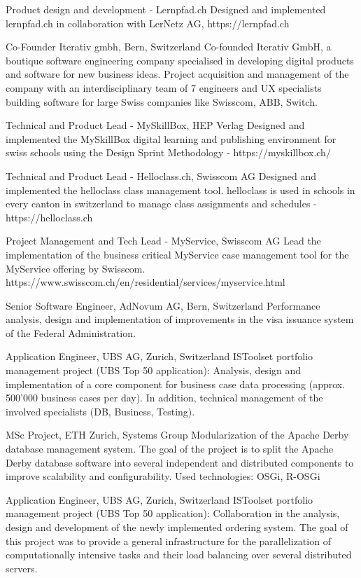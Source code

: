 \documentclass[10pt]{moderncv}
\begin{document}
\workitem{}
{Product design and development - Lernpfad.ch}
{Designed and implemented lernpfad.ch in collaboration with LerNetz AG, https://lernpfad.ch}


{Co-Founder Iterativ gmbh, Bern, Switzerland}
{Co-founded Iterativ GmbH, a boutique software engineering company specialised in developing digital 
products and software for new business ideas. Project acquisition and management of the company 
with an interdisciplinary team of 7 engineers and UX specialists building software for large Swiss 
companies like Swisscom, ABB, Switch.}

\workitem{}
{Technical and Product Lead - MySkillBox, HEP Verlag}
{Designed and implemented the MySkillBox digital learning and publishing environment for swiss 
schools using the Design Sprint Methodology - https://myskillbox.ch/}

\workitem{}
{Technical and Product Lead - Helloclass.ch, Swisscom AG}
{Designed and implemented the helloclass class management tool. helloclass is used in schools in 
every canton in switzerland to manage class assignments and schedules - https://helloclass.ch}

\workitem{}
{Project Management and Tech Lead - MyService, Swisscom AG}
{Lead the implementation of the business critical MyService case management tool for the MyService 
offering by Swisscom. \smallpara https://www.swisscom.ch/en/residential/services/myservice.html}


{Senior Software Engineer, AdNovum AG, Bern, Switzerland}
{Performance analysis, design and implementation of improvements in the visa issuance system of 
the Federal Administration.}


{Application Engineer, UBS AG, Zurich, Switzerland}
{ISToolset portfolio management project (UBS Top 50 application): 
Analysis, design and implementation of a core component for business case data processing (approx. 
500'000 business cases per day). In addition, technical management of the involved specialists 
(DB, Business, Testing).}


{MSc Project, ETH Zurich, Systems Group}
{Modularization of the Apache Derby database management system.
The goal of the project is to split the Apache Derby database software into several independent 
and distributed components to improve scalability and configurability. Used technologies: OSGi, R-OSGi}


{Application Engineer, UBS AG, Zurich, Switzerland}
{ISToolset portfolio management project (UBS Top 50 application):
Collaboration in the analysis, design and development of the newly implemented ordering system. 
The goal of this project was to provide a general infrastructure for the parallelization of computationally 
intensive tasks and their load balancing over several distributed servers.}
\end{document}

